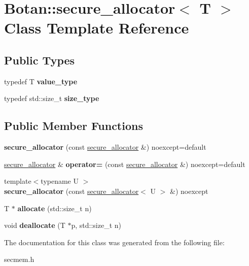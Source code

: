 \hypertarget{class_botan_1_1secure__allocator}{}\section{Botan\+:\+:secure\+\_\+allocator$<$ T $>$ Class Template Reference}
\label{class_botan_1_1secure__allocator}
\subsection*{Public Types}
\begin{DoxyCompactItemize}
\item 
\mbox{\label{class_botan_1_1secure__allocator_a8ca8013fa95cc954cb9ce6a2f9b92be6}} 
typedef T {\bfseries value\+\_\+type}
\item 
\mbox{\label{class_botan_1_1secure__allocator_a9ce6d4fd06ca8565f70adf9274a4ccd0}} 
typedef std\+::size\+\_\+t {\bfseries size\+\_\+type}
\end{DoxyCompactItemize}
\subsection*{Public Member Functions}
\begin{DoxyCompactItemize}
\item 
\mbox{\label{class_botan_1_1secure__allocator_a86f8294a67b0587b2377379b25c4d165}} 
{\bfseries secure\+\_\+allocator} (const \hyperlink{class_botan_1_1secure__allocator}{secure\+\_\+allocator} \&) noexcept=default
\item 
\mbox{\label{class_botan_1_1secure__allocator_a15fd1dbcb0ddd6640783ebf71286d069}} 
\hyperlink{class_botan_1_1secure__allocator}{secure\+\_\+allocator} \& {\bfseries operator=} (const \hyperlink{class_botan_1_1secure__allocator}{secure\+\_\+allocator} \&) noexcept=default
\item 
\mbox{\label{class_botan_1_1secure__allocator_a6dc4218b164bdc88705b1f7fbfd01000}} 
{\footnotesize template$<$typename U $>$ }\\{\bfseries secure\+\_\+allocator} (const \hyperlink{class_botan_1_1secure__allocator}{secure\+\_\+allocator}$<$ U $>$ \&) noexcept
\item 
\mbox{\label{class_botan_1_1secure__allocator_af45defc71c1d292185e0bb6cc281a995}} 
T $\ast$ {\bfseries allocate} (std\+::size\+\_\+t n)
\item 
\mbox{\label{class_botan_1_1secure__allocator_a229c70a58ce7bf5c4a0fec703314324a}} 
void {\bfseries deallocate} (T $\ast$p, std\+::size\+\_\+t n)
\end{DoxyCompactItemize}


The documentation for this class was generated from the following file\+:\begin{DoxyCompactItemize}
\item 
secmem.\+h\end{DoxyCompactItemize}
